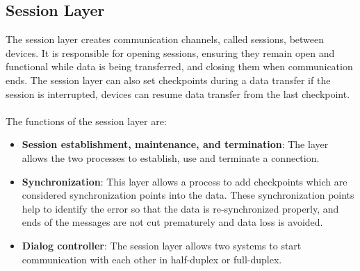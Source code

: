 \documentclass{article}
\begin{document}
    \subsection{Session Layer}
    The session layer creates communication channels, called sessions, between devices. It is responsible for opening sessions, ensuring they remain open and functional while data is being transferred, and closing them when communication ends. The session layer can also set checkpoints during a data transfer if the session is interrupted, devices can resume data transfer from the last checkpoint. \\ \\
    The functions of the session layer are:
    \begin{itemize}
        \item \textbf{Session establishment, maintenance, and termination}: The layer allows the two processes to establish, use and terminate a connection.
        \item \textbf{Synchronization}: This layer allows a process to add checkpoints which are considered synchronization points into the data. These synchronization points help to identify the error so that the data is re-synchronized properly, and ends of the messages are not cut prematurely and data loss is avoided.
        \item \textbf{Dialog controller}: The session layer allows two systems to start communication with each other in half-duplex or full-duplex.
    \end{itemize}
\end{document}

